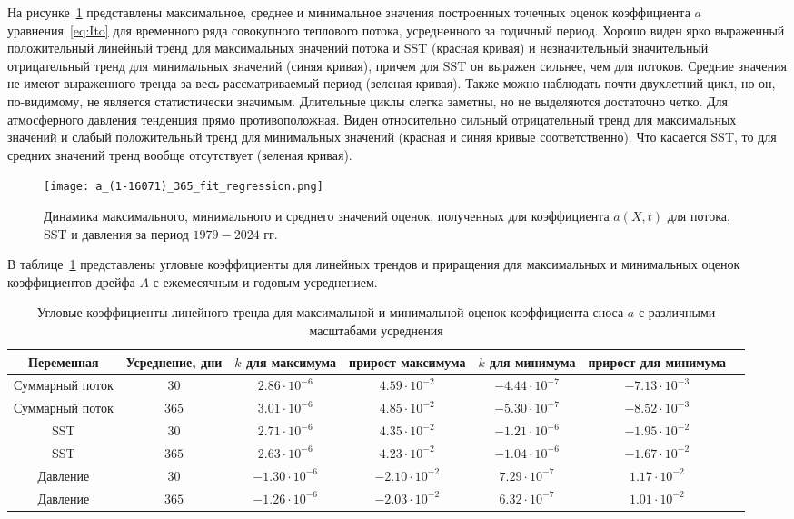 На рисунке~\ref{fig:a_extreme_365} представлены максимальное, среднее и минимальное значения построенных точечных оценок коэффициента $a$ уравнения~\eqref{eq:Ito} для временного ряда совокупного теплового потока, усредненного за годичный период. Хорошо виден ярко выраженный положительный линейный тренд для максимальных значений потока и SST (красная кривая) и незначительный значительный отрицательный тренд для минимальных значений (синяя кривая), причем для SST он выражен сильнее, чем для потоков. Средние значения не имеют выраженного тренда за весь рассматриваемый период (зеленая кривая). Также можно наблюдать почти двухлетний цикл, но он, по-видимому, не является статистически значимым. Длительные циклы слегка заметны, но не выделяются достаточно четко. Для атмосферного давления тенденция прямо противоположная. Виден относительно сильный отрицательный тренд для максимальных значений и слабый положительный тренд для минимальных значений (красная и синяя кривые соответственно). Что касается SST, то для средних значений тренд вообще отсутствует (зеленая кривая).


\begin{figure}
	\centering
	\texttt{[image: a\_(1-16071)\_365\_fit\_regression.png]}
	\caption{Динамика максимального, минимального и среднего значений оценок, полученных для коэффициента $a(X,t)$ для потока, SST и давления за период $1979-2024$ гг.} 
	\label{fig:a_extreme_365}
\end{figure}

В таблице~\ref{tab:angular_3d} представлены угловые коэффициенты для линейных трендов и приращения для максимальных и минимальных оценок коэффициентов дрейфа $A$ с ежемесячным и годовым усреднением.

\begin{table}
	\centering
	\begin{tabular}{|c|c|c|c|c|c|c|}
		\hline
		Переменная & Усреднение, дни & $k$ для максимума & прирост максимума & $k$ для минимума & прирост для минимума\\
		\hline
		Суммарный поток & $30$ & $2.86 \cdot 10^{-6}$ & $4.59 \cdot 10^{-2}$ & $-4.44 \cdot 10^{-7}$ & $-7.13 \cdot 10^{-3}$ \\
		Суммарный поток & $365$ & $3.01 \cdot 10^{-6}$ & $4.85 \cdot 10^{-2}$ & $-5.30 \cdot 10^{-7}$ & $-8.52 \cdot 10^{-3}$    \\
		SST & $30$ & $2.71 \cdot 10^{-6}$ & $4.35 \cdot 10^{-2}$ & $-1.21 \cdot 10^{-6}$ & $-1.95 \cdot 10^{-2}$   \\
		SST & $365$ & $2.63 \cdot 10^{-6}$ & $4.23 \cdot 10^{-2}$ & $-1.04 \cdot 10^{-6}$ & $-1.67 \cdot 10^{-2}$    \\
		Давление & $30$ & $-1.30 \cdot 10^{-6}$ & $-2.10 \cdot 10^{-2}$ & $7.29 \cdot 10^{-7}$ & $1.17 \cdot 10^{-2}$ \\
		Давление & $365$ & $-1.26 \cdot 10^{-6}$ & $-2.03 \cdot 10^{-2}$ & $6.32 \cdot 10^{-7}$ & $1.01 \cdot 10^{-2}$ \\
		\hline
	\end{tabular}
	\caption{Угловые коэффициенты линейного тренда для максимальной и минимальной оценок коэффициента сноса $a$ с различными масштабами усреднения}
	\label{tab:angular_3d}
\end{table}

